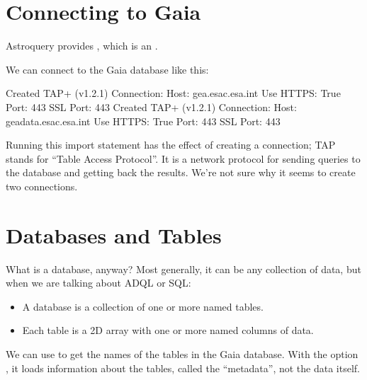 \documentclass[letterpaper,10pt,english]{sphinxmanual}
\begin{document}
\section{Connecting to Gaia}
\label{\detokenize{01_query:connecting-to-gaia}}
Astroquery provides , which is an .

We can connect to the Gaia database like this:

\begin{sphinxVerbatim}[commandchars=\\\{\}]
   
\end{sphinxVerbatim}

\begin{sphinxVerbatim}[commandchars=\\\{\}]
Created TAP+ (v1.2.1) \PYGZhy{} Connection:
	Host: gea.esac.esa.int
	Use HTTPS: True
	Port: 443
	SSL Port: 443
Created TAP+ (v1.2.1) \PYGZhy{} Connection:
	Host: geadata.esac.esa.int
	Use HTTPS: True
	Port: 443
	SSL Port: 443
\end{sphinxVerbatim}

Running this import statement has the effect of creating a  connection; TAP stands for “Table Access Protocol”.  It is a network protocol for sending queries to the database and getting back the results.  We’re not sure why it seems to create two connections.


\section{Databases and Tables}
\label{\detokenize{01_query:databases-and-tables}}
What is a database, anyway?  Most generally, it can be any collection of data, but when we are talking about ADQL or SQL:
\begin{itemize}
\item {} 
A database is a collection of one or more named tables.

\item {} 
Each table is a 2\sphinxhyphen{}D array with one or more named columns of data.

\end{itemize}

We can use  to get the names of the tables in the Gaia database.  With the option , it loads information about the tables, called the “metadata”, not the data itself.
\end{document}
